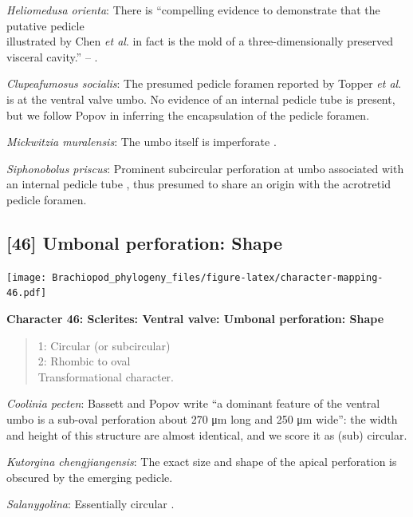 \documentclass[]{book}
\theoremstyle{definition}
\theoremstyle{definition}
\theoremstyle{definition}
\theoremstyle{remark}
\begin{document}
\emph{Heliomedusa orienta}: There is ``compelling evidence to
demonstrate that the putative pedicle\\
illustrated by Chen \emph{et al}. \citeyearpar[Figs. 4, 6,
7]{Chen2007Reinterpretationof} in fact is the mold of a
three-dimensionally preserved visceral cavity.'' --
\citet{Zhang2009Architectureand}.

\emph{Clupeafumosus socialis}: The presumed pedicle foramen reported by
Topper \emph{et al}. \citeyearpar{Topper2013Reappraisalof} is at the
ventral valve umbo. No evidence of an internal pedicle tube is present,
but we follow Popov \citeyearpar{Popov1992TheCambrian} in inferring the
encapsulation of the pedicle foramen.

\emph{Mickwitzia muralensis}: The umbo itself is imperforate
\citep{Balthasar2004Shellstructure}.

\emph{Siphonobolus priscus}: Prominent subcircular perforation at umbo
associated with an internal pedicle tube \citep{Popov2009Earlyontogeny},
thus presumed to share an origin with the acrotretid pedicle foramen.

\hypertarget{umbonal-perforation-shape}{%
\subsection*{{[}46{]} Umbonal perforation:
Shape}\label{umbonal-perforation-shape}}

\texttt{[image: Brachiopod\_phylogeny\_files/figure-latex/character-mapping-46.pdf]}

\textbf{Character 46: Sclerites: Ventral valve: Umbonal perforation:
Shape}

\begin{quote}
1: Circular (or subcircular)\\
2: Rhombic to oval\\
Transformational character.
\end{quote}

\emph{Coolinia pecten}: Bassett and Popov write ``a dominant feature of
the ventral umbo is a sub-oval perforation about 270 μm long and 250 μm
wide'': the width and height of this structure are almost identical, and
we score it as (sub) circular.

\emph{Kutorgina chengjiangensis}: The exact size and shape of the apical
perforation is obscured by the emerging pedicle.

\emph{Salanygolina}: Essentially circular \citep[fig.
4]{Holmer2009Theenigmatic}.
\end{document}
